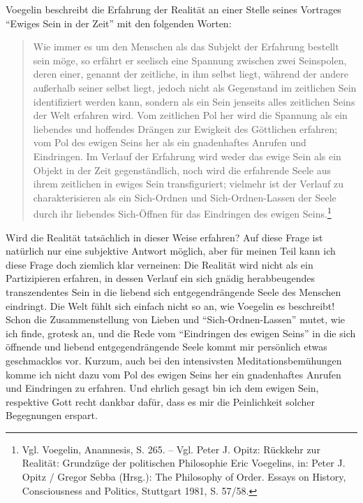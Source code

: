 Voegelin beschreibt die Erfahrung der Realität an einer Stelle seines
Vortrages "`Ewiges Sein in der Zeit"' mit den folgenden Worten:
 \begin{quote}\label{ZitatSeinserfahrung}
   Wie immer es um den Menschen als das Subjekt der Erfahrung bestellt sein
   möge, so erfährt er seelisch eine Spannung zwischen zwei Seinspolen, deren
   einer, genannt der zeitliche, in ihm selbst liegt, während der andere
   außerhalb seiner selbst liegt, jedoch nicht als Gegenstand im zeitlichen
   Sein identifiziert werden kann, sondern als ein Sein jenseits alles
   zeitlichen Seins der Welt erfahren wird. Vom zeitlichen Pol her wird die
   Spannung als ein liebendes und hoffendes Drängen zur Ewigkeit des
   Göttlichen erfahren; vom Pol des ewigen Seins her als ein gnadenhaftes
   Anrufen und Eindringen. Im Verlauf der Erfahrung wird weder das ewige Sein
   als ein Objekt in der Zeit gegenständlich, noch wird die erfahrende Seele
   aus ihrem zeitlichen in ewiges Sein transfiguriert; vielmehr ist der
   Verlauf zu charakterisieren als ein Sich-Ordnen und Sich-Ordnen-Lassen der
   Seele durch ihr liebendes Sich-Öffnen für das Eindringen des ewigen
   Seins.\footnote{Vgl. Voegelin, Anamnesis, S. 265. -- Vgl. Peter J. Opitz:
     Rückkehr zur Realität: Grundzüge der politischen Philosophie Eric
     Voegelins, in: Peter J.  Opitz / Gregor Sebba (Hrsg.): The Philosophy of
     Order. Essays on History, Consciousness and Politics, Stuttgart 1981,
     S. 57/58.}
 \end{quote}
 Wird die Realität tatsächlich in dieser Weise erfahren? Auf diese Frage ist
 natürlich nur eine subjektive Antwort möglich, aber für meinen Teil kann ich
 diese Frage doch ziemlich klar verneinen: Die Realität wird nicht als ein
 Partizipieren erfahren, in dessen Verlauf ein sich gnädig herabbeugendes
 transzendentes Sein in die liebend sich entgegendrängende Seele des Menschen
 eindringt. Die Welt fühlt sich einfach nicht so an, wie Voegelin es
 beschreibt! Schon die Zusammenstellung von Lieben und "`Sich-Ordnen-Lassen"'
 mutet, wie ich finde, grotesk an, und die Rede vom "`Eindringen des ewigen
 Seins"' in die sich öffnende und liebend entgegendrängende Seele kommt mir
 persönlich etwas geschmacklos vor. Kurzum, auch bei den intensivsten
 Meditationsbemühungen komme ich nicht dazu vom Pol des ewigen Seins her ein
 gnadenhaftes Anrufen und Eindringen zu erfahren.  Und ehrlich gesagt bin ich
 dem ewigen Sein, respektive Gott recht dankbar dafür, dass es mir die
 Peinlichkeit solcher Begegnungen erspart.

